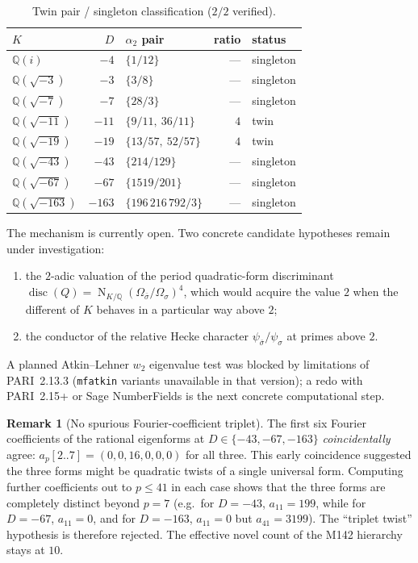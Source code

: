 \documentclass[12pt]{amsart}
\theoremstyle{definition}
\newtheorem{remark}[theorem]{Remark}
\DeclareMathOperator{\Nm}{N}
\DeclareMathOperator{\disc}{disc}
\newcommand{\Q}{\mathbb{Q}}
\begin{document}
\begin{table}[h]
  \caption{Twin pair / singleton classification ($2/2$ verified).}
  \label{tab:M184}
  \renewcommand{\arraystretch}{1.20}
  \begin{tabular}{lrlrl}
    \toprule
    $K$ & $D$ & $\alpha_2$ pair & ratio & status \\
    \midrule
    $\Q(i)$           & $-4$   & $\{1/12\}$           & ---     & singleton \\
    $\Q(\sqrt{-3})$   & $-3$   & $\{3/8\}$            & ---     & singleton \\
    $\Q(\sqrt{-7})$   & $-7$   & $\{28/3\}$           & ---     & singleton \\
    $\Q(\sqrt{-11})$  & $-11$  & $\{9/11,\ 36/11\}$   & $4$     & twin \\
    $\Q(\sqrt{-19})$  & $-19$  & $\{13/57,\ 52/57\}$  & $4$     & twin \\
    $\Q(\sqrt{-43})$  & $-43$  & $\{214/129\}$        & ---     & singleton \\
    $\Q(\sqrt{-67})$  & $-67$  & $\{1519/201\}$       & ---     & singleton \\
    $\Q(\sqrt{-163})$ & $-163$ & $\{196\,216\,792/3\}$& ---     & singleton \\
    \bottomrule
  \end{tabular}
\end{table}

The mechanism is currently open. Two concrete candidate hypotheses
remain under investigation:
\begin{enumerate}[leftmargin=2em]
  \item the $2$-adic valuation of the period quadratic-form discriminant
        $\disc(Q) = \Nm_{K/\Q}(\Omega_{\bar\sigma}/\Omega_\sigma)^4$,
        which would acquire the value $2$ when the
        different of $K$ behaves in a particular way above $2$;
  \item the conductor of the relative Hecke character
        $\psi_{\bar\sigma}/\psi_\sigma$ at primes above $2$.
\end{enumerate}
A planned Atkin--Lehner $w_2$ eigenvalue test was blocked by
limitations of PARI~2.13.3 (\texttt{mfatkin} variants unavailable in
that version); a redo with PARI~2.15+ or Sage NumberFields is the next
concrete computational step.

\begin{remark}[No spurious Fourier-coefficient triplet]
The first six Fourier coefficients of the rational eigenforms at
$D \in \{-43,-67,-163\}$ \emph{coincidentally} agree:
$a_p[2..7] = (0,0,16,0,0,0)$ for all three. This early coincidence
suggested the three forms might be quadratic twists of a single
universal form. Computing further coefficients out to $p \le 41$ in
each case shows that the three forms are completely distinct beyond
$p = 7$ (e.g.\ for $D = -43$, $a_{11} = 199$, while for $D = -67$,
$a_{11} = 0$, and for $D = -163$, $a_{11} = 0$ but $a_{41} = 3199$).
The ``triplet twist'' hypothesis is therefore rejected. The
effective novel count of the M142 hierarchy stays at $10$.
\end{remark}
\end{document}
